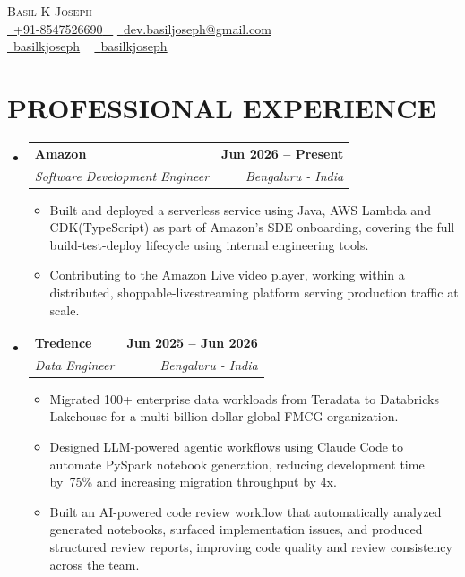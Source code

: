 \documentclass[letterpaper,11pt]{article}
\makeatletter
\newcommand{\resumeItem}[1]{
  \item\small{
    {#1 \vspace{-2pt}}
  }
}
\newcommand{\resumeSubheading}[4]{
  \vspace{-2pt}\item
    \begin{tabular*}{1.0\textwidth}[t]{l@{\extracolsep{\fill}}r}
      \textbf{\large#1} & \textbf{\small #2} \\
      \textit{\large#3} & \textit{\small #4} \\
      
    \end{tabular*}\vspace{-7pt}
}
\newcommand{\resumeSubHeadingListStart}{\begin{itemize}[leftmargin=0.0in, label={}]}
\newcommand{\resumeSubHeadingListEnd}{\end{itemize}}
\newcommand{\resumeItemListStart}{\begin{itemize}}
\newcommand{\resumeItemListEnd}{\end{itemize}\vspace{-5pt}}
\makeatother
\begin{document}

\begin{center}
    {\Huge \scshape Basil K Joseph} \\ \vspace{3pt}
    \small \href{tel:+91 8547526690}{ \raisebox{-0.1\height}\faPhone\ \underline{+91-8547526690} ~} \href{mailto:dev.basiljoseph@gmail.com}{\raisebox{-0.2\height}\faEnvelope\  \underline{dev.basiljoseph@gmail.com}} ~ \\
    \href{https://github.com/basilkjoseph}{\raisebox{-0.2\height}\faGithub\ \underline{basilkjoseph}} ~
    \href{https://linkedin.com/in/basilkjoseph}{\raisebox{-0.2\height}\faLinkedinSquare\ \underline{basilkjoseph}}  ~
    \vspace{-8pt}
\end{center}

    \vspace{-2pt}


\section{PROFESSIONAL EXPERIENCE}
    \resumeSubHeadingListStart
        \resumeSubheading{Amazon \href{Certificate Proof link}{ } }{Jun 2026 -- Present}{{Software Development Engineer}}{Bengaluru - India}
            \resumeItemListStart
                \resumeItem{\normalsize{Built and deployed a serverless service using Java, AWS Lambda and CDK(TypeScript) as part of Amazon's SDE onboarding, covering the full build-test-deploy lifecycle using internal engineering tools.}}
                \resumeItem{\normalsize{Contributing to the Amazon Live video player, working within a distributed, shoppable-livestreaming platform serving production traffic at scale.}}
            \resumeItemListEnd
    \resumeSubHeadingListEnd

    \vspace{-15pt}

    \resumeSubHeadingListStart
        \resumeSubheading{Tredence \href{Certificate Proof link}{ } }{Jun 2025 -- Jun 2026}{{Data Engineer}}{Bengaluru - India}
            \resumeItemListStart
                \resumeItem{\normalsize{Migrated 100+ enterprise data workloads from Teradata to Databricks Lakehouse for a multi-billion-dollar global FMCG organization.}}
                \resumeItem{\normalsize{Designed LLM-powered agentic workflows using Claude Code to automate PySpark notebook generation, reducing development time by~75\% and increasing migration throughput by 4x.}}
                \resumeItem{\normalsize{Built an AI-powered code review workflow that automatically analyzed generated notebooks, surfaced implementation issues, and produced structured review reports, improving code quality and review consistency across the team.}}
            \resumeItemListEnd
    \resumeSubHeadingListEnd
 
\end{document}
